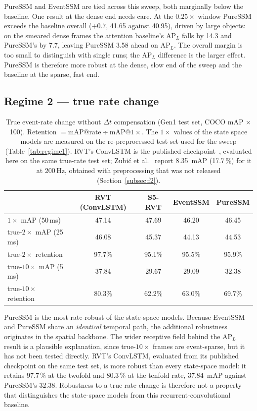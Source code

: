 \documentclass[11pt, a4paper]{report}
\begin{document}
PureSSM and EventSSM are tied across this sweep, both marginally below the baseline. One result at the
dense end needs care. At the $0.25\times$ window PureSSM exceeds the baseline overall ($+0.7$, 41.65 against 40.95), driven
by large objects: on the smeared dense frames the attention baseline's $\mathrm{AP}_L$ falls by 14.3 and
PureSSM's by 7.7, leaving PureSSM 3.58 ahead on $\mathrm{AP}_L$. The overall margin is too small to
distinguish with single runs; the $\mathrm{AP}_L$ difference is the larger effect. PureSSM is therefore more robust at the dense,
slow end of the sweep and the baseline at the sparse, fast end.

\subsection{Regime 2 --- true rate change}
\begin{table}[htbp]
\centering
\caption{True event-rate change without $\Delta t$ compensation (Gen1 test set, COCO mAP $\times$ 100).
Retention $=\mathrm{mAP}@\text{rate} \div \mathrm{mAP}@1\times$. The $1\times$ values of the state space
models are measured on the re-preprocessed test set used for the sweep (Table~\ref{tab:regime1}). RVT's
ConvLSTM is the published checkpoint~\cite{gehrig2023recurrent}, evaluated here on the same true-rate test
set; Zubi\'{c} et al.~\cite{zubic2024state} report 8.35~mAP (17.7\,\%) for it at 200\,Hz, obtained with
preprocessing that was not released (Section~\ref{subsec:f2}).}
\label{tab:regime2}
\begin{tabular}{lcccc}
\toprule
 & \textbf{RVT (ConvLSTM)} & \textbf{S5-RVT} & \textbf{EventSSM} & \textbf{PureSSM} \\
\midrule
$1\times$ mAP (50\,ms)        & 47.14  & 47.69  & 46.20  & 46.45 \\
true-$2\times$ mAP (25\,ms)   & 46.08  & 45.37  & 44.13  & 44.53 \\
true-$2\times$ retention      & 97.7\% & 95.1\% & 95.5\% & 95.9\% \\
true-$10\times$ mAP (5\,ms)   & 37.84  & 29.67  & 29.09  & 32.38 \\
true-$10\times$ retention     & 80.3\% & 62.2\% & 63.0\% & 69.7\% \\
\bottomrule
\end{tabular}
\end{table}

PureSSM is the most rate-robust of the state-space models. Because EventSSM and PureSSM share an
\emph{identical} temporal path, the additional robustness originates in the spatial backbone. The wider
receptive field behind the $\mathrm{AP}_L$ result is a plausible explanation, since true-$10\times$ frames
are event-sparse, but it has not been tested directly. RVT's ConvLSTM, evaluated from its published
checkpoint on the same test set, is more robust than every state-space model: it retains 97.7\,\% at the
twofold and 80.3\,\% at the tenfold rate, 37.84~mAP against PureSSM's 32.38. Robustness to a true rate
change is therefore not a property that distinguishes the state-space models from this
recurrent-convolutional baseline.
\end{document}
